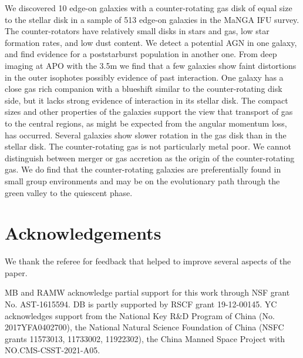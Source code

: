\documentclass[fleqn,usenatbib]{mnras}
\begin{document}
We discovered 10 edge-on galaxies with a counter-rotating gas disk of equal size to the stellar disk in a sample of 513 edge-on galaxies in the MaNGA IFU survey. The counter-rotators have relatively small disks in stars and gas, low star formation rates, and low dust content. We detect a potential AGN in one galaxy, and find evidence for a poststarburst population in another one. From deep imaging at APO with the 3.5m we find that a few galaxies show faint distortions in the outer isophotes possibly evidence of past interaction. One galaxy has a close gas rich companion with a blueshift similar to the counter-rotating disk side, but it lacks strong evidence of interaction in its stellar disk. The compact sizes and other properties of the galaxies support the view that transport of gas to the central regions, as might be expected from the angular momentum loss, has occurred. Several galaxies show slower rotation in the gas disk than in the stellar disk. The counter-rotating gas is not particularly metal poor. We cannot distinguish between merger or gas accretion as the origin of the counter-rotating gas. We do find that the counter-rotating galaxies are preferentially found in small group environments and may be on the evolutionary path through the green valley to the quiescent phase.








\section*{Acknowledgements}

We thank the referee for feedback that helped to improve several aspects of the paper.

MB and RAMW acknowledge partial support for this work through NSF grant No. AST-1615594. DB is partly supported by RSCF grant 19-12-00145. YC acknowledges support from the National Key R\&D Program of China (No. 2017YFA0402700), the National Natural Science Foundation of China (NSFC grants 11573013, 11733002, 11922302), the China Manned Space Project with NO.CMS-CSST-2021-A05.
\end{document}
